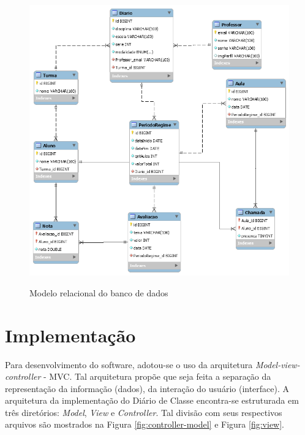 \begin{figure}[!htb]
	\centering
	
	\includegraphics[scale=0.6]{relacional}\\  %
	\caption{Modelo relacional do banco de dados} %
	{\small } %
	\label{fig:relacional} %
\end{figure}

\section{Implementação}


Para desenvolvimento do software, adotou-se o uso da arquitetura \textit{Model-view-controller} - MVC. Tal arquitetura propõe que seja feita a separação da representação da informação (dados), da interação do usuário (interface). A arquitetura da implementação do Diário de Classe encontra-se estruturada em três diretórios: \textit{Model}, \textit{View} e \textit{Controller}. Tal divisão com seus respectivos arquivos são mostrados na Figura \ref{fig:controller-model} e Figura \ref{fig:view}.

